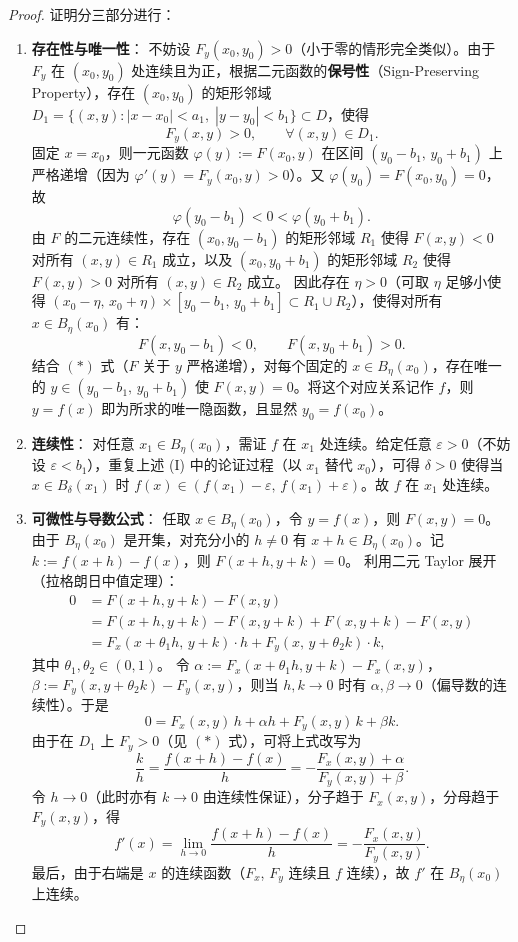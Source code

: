 \documentclass[lang=cn,11pt]{elegantbook}
\begin{document}
\begin{proof}
证明分三部分进行：
\begin{enumerate}
  \item[\textbf{(I)}] \textbf{存在性与唯一性}：
  不妨设 $F_y(x_0,y_0)>0$（小于零的情形完全类似）。由于 $F_y$ 在 $(x_0,y_0)$ 处连续且为正，根据二元函数的\textbf{保号性}（Sign-Preserving Property），存在 $(x_0,y_0)$ 的矩形邻域 $D_1=\{(x,y):|x-x_0|<a_1,\;|y-y_0|<b_1\}\subset D$，使得
  \[
  F_y(x,y)>0,\qquad\forall(x,y)\in D_1. \tag{*}
  \]
  固定 $x=x_0$，则一元函数 $\varphi(y):=F(x_0,y)$ 在区间 $(y_0-b_1,\,y_0+b_1)$ 上严格递增（因为 $\varphi'(y)=F_y(x_0,y)>0$）。又 $\varphi(y_0)=F(x_0,y_0)=0$，故
  \[
  \varphi(y_0-b_1)<0<\varphi(y_0+b_1).
  \]
  由 $F$ 的二元连续性，存在 $(x_0,y_0-b_1)$ 的矩形邻域 $R_1$ 使得 $F(x,y)<0$ 对所有 $(x,y)\in R_1$ 成立，以及 $(x_0,y_0+b_1)$ 的矩形邻域 $R_2$ 使得 $F(x,y)>0$ 对所有 $(x,y)\in R_2$ 成立。
  因此存在 $\eta>0$（可取 $\eta$ 足够小使得 $(x_0-\eta,\,x_0+\eta)\times[y_0-b_1,\,y_0+b_1]\subset R_1\cup R_2$），使得对所有 $x\in B_\eta(x_0)$ 有：
  \[
  F(x,y_0-b_1)<0,\qquad F(x,y_0+b_1)>0.
  \]
  结合 $(*)$ 式（$F$ 关于 $y$ 严格递增），对每个固定的 $x\in B_\eta(x_0)$，存在唯一的 $y\in(y_0-b_1,\,y_0+b_1)$ 使 $F(x,y)=0$。将这个对应关系记作 $f$，则 $y=f(x)$ 即为所求的唯一隐函数，且显然 $y_0=f(x_0)$。

  \item[\textbf{(II)}] \textbf{连续性}：
  对任意 $x_1\in B_\eta(x_0)$，需证 $f$ 在 $x_1$ 处连续。给定任意 $\varepsilon>0$（不妨设 $\varepsilon<b_1$），重复上述 (I) 中的论证过程（以 $x_1$ 替代 $x_0$），可得 $\delta>0$ 使得当 $x\in B_\delta(x_1)$ 时 $f(x)\in(f(x_1)-\varepsilon,\,f(x_1)+\varepsilon)$。故 $f$ 在 $x_1$ 处连续。

  \item[\textbf{(III)}] \textbf{可微性与导数公式}：
  任取 $x\in B_\eta(x_0)$，令 $y=f(x)$，则 $F(x,y)=0$。由于 $B_\eta(x_0)$ 是开集，对充分小的 $h \neq 0$ 有 $x+h\in B_\eta(x_0)$。记 $k:=f(x+h)-f(x)$，则 $F(x+h,y+k)=0$。
  利用二元 Taylor 展开（拉格朗日中值定理）：
  \begin{align*}
  0 &= F(x+h,y+k)-F(x,y) \\
    &= F(x+h,y+k)-F(x,y+k)+F(x,y+k)-F(x,y) \\
    &= F_x(x+\theta_1 h,\,y+k)\cdot h+F_y(x,\,y+\theta_2 k)\cdot k,
  \end{align*}
  其中 $\theta_1,\theta_2\in(0,1)$。
  令 $\alpha:=F_x(x+\theta_1 h,y+k)-F_x(x,y)$，$\beta:=F_y(x,y+\theta_2 k)-F_y(x,y)$，则当 $h,k\to 0$ 时有 $\alpha,\beta\to 0$（偏导数的连续性）。于是
  \[
  0=F_x(x,y)\,h+\alpha h+F_y(x,y)\,k+\beta k.
  \]
  由于在 $D_1$ 上 $F_y>0$（见 $(*)$ 式），可将上式改写为
  \[
  \frac{k}{h}=\frac{f(x+h)-f(x)}{h} = -\frac{F_x(x,y)+\alpha}{F_y(x,y)+\beta}.
  \]
  令 $h\to 0$（此时亦有 $k\to 0$ 由连续性保证），分子趋于 $F_x(x,y)$，分母趋于 $F_y(x,y)$，得
  \[
  f'(x)=\lim_{h\to 0}\frac{f(x+h)-f(x)}{h} =-\frac{F_x(x,y)}{F_y(x,y)}.
  \]
  最后，由于右端是 $x$ 的连续函数（$F_x$, $F_y$ 连续且 $f$ 连续），故 $f'$ 在 $B_\eta(x_0)$ 上连续。
\end{enumerate}
\end{proof}
\end{document}
